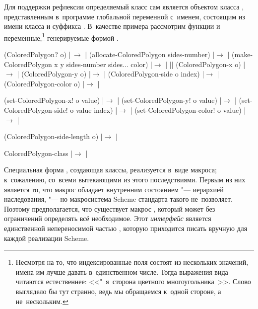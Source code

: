 Для поддержки рефлексии определяемый класс сам является объектом класса
, представленным в~программе глобальной переменной с~именем, состоящим
из имени класса и суффикса . В~качестве примера рассмотрим функции и
переменные,\footnote*{Несмотря на то, что индексированные поля состоят из
нескольких значений, имена им лучше давать в~единственном числе. Тогда выражения
вида  читаются естественнее:
<<"~я~сторона цветного многоугольника~>>. Слово 
выглядело бы тут странно, ведь мы обращаемся к~одной стороне, а не~нескольким.}
генерируемые формой .

\begin{code:lisp}
(ColoredPolygon? o)                              |\,$\to$ |
(allocate-ColoredPolygon sides-number)                |$\to$ |
(make-ColoredPolygon x y sides-number sides... color) |$\to$ |
||
(ColoredPolygon-x o)                                  |$\to$ |
(ColoredPolygon-y o)                                  |$\to$ |
(ColoredPolygon-side o index)                         |$\to$ |
(ColoredPolygon-color o)                              |$\to$ |

(set-ColoredPolygon-x! o value)                       |$\to$ |
(set-ColoredPolygon-y! o value)                       |$\to$ |
(set-ColoredPolygon-side! o value index)              |$\to$ |
(set-ColoredPolygon-color! o value)                   |$\to$ |

(ColoredPolygon-side-length o)                        |$\to$ |

ColoredPolygon-class                                  |$\to$ |
\end{code:lisp}

Специальная форма , создающая классы, реализуется в~виде
макроса; к~сожалению, со~всеми вытекающими из этого последствиями. Первым из
них является то, что макрос  обладает внутренним состоянием
"--- иерархией наследования, "--- но макросистема Scheme стандарта {\RnRS}
такого не~позволяет. Поэтому предполагается, что существует макрос
, который может без ограничений определять всё
необходимое. Этот \emph{интерфейс} является единственной непереносимой частью
{\Meroonet}, которую приходится писать вручную для каждой реализации Scheme.

